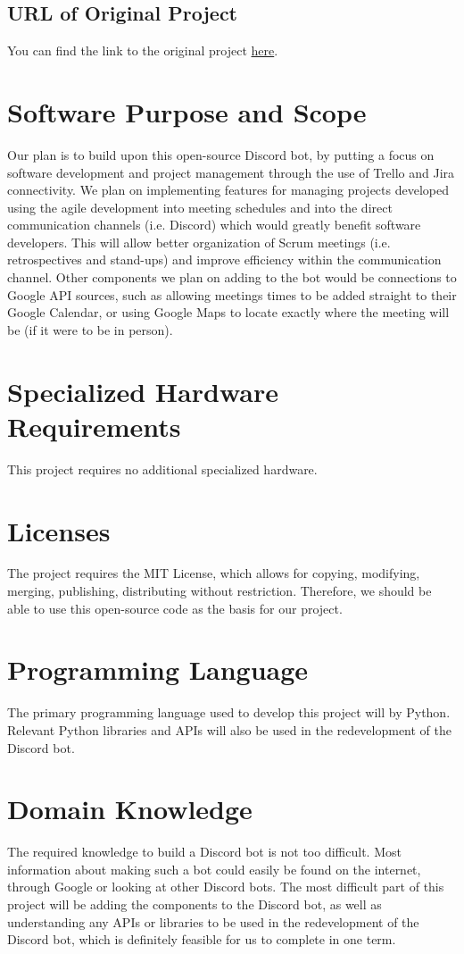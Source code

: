 \documentclass[12pt]{article}
\begin{document}
\subsection{URL of Original Project}
You can find the link to the original project \href{https://github.com/Code-Plus-Plus/discord-meeting-bot}{here}.

\section{Software Purpose and Scope}
Our plan is to build upon this open-source Discord bot, by putting a focus on software development and project management through the use of Trello and Jira connectivity. We plan on implementing features for managing projects developed using the agile development into meeting schedules and into the direct communication channels (i.e. Discord) which would greatly benefit software developers. This will allow better organization of Scrum meetings (i.e. retrospectives and stand-ups) and improve efficiency within the communication channel. Other components we plan on adding to the bot would be connections to Google API sources, such as allowing meetings times to be added straight to their Google Calendar, or using Google Maps to locate exactly where the meeting will be (if it were to be in person).

\section{Specialized Hardware Requirements}
This project requires no additional specialized hardware.

\section{Licenses}
The project requires the MIT License, which allows for copying, modifying, merging, publishing, distributing without restriction. Therefore, we should be able to use this open-source code as the basis for our project.

\section{Programming Language}
The primary programming language used to develop this project will by Python. Relevant Python libraries and APIs will also be used in the redevelopment of the Discord bot.

\section{Domain Knowledge}
The required knowledge to build a Discord bot is not too difficult. Most information about making such a bot could easily be found on the internet, through Google or looking at other Discord bots. The most difficult part of this project will be adding the components to the Discord bot, as well as understanding any APIs or libraries to be used in the redevelopment of the Discord bot, which is definitely feasible for us to complete in one term.
\end{document}
